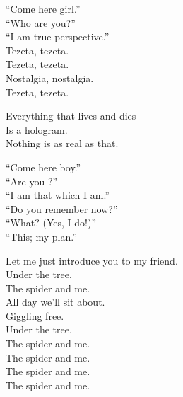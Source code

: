 
``Come here girl.'' \\
``Who are you?'' \\
``I am true perspective.'' \\

Tezeta, tezeta. \\
Tezeta, tezeta. \\
Nostalgia, nostalgia. \\
Tezeta, tezeta. \\


Everything that lives and dies \\
Is a hologram. \\
Nothing is as real as that. \\


``Come here boy.'' \\
``Are you ?'' \\
``I am that which I am.'' \\

``Do you remember now?'' \\
``What? (Yes, I do!)'' \\
``This; my  plan.'' \\









Let me just introduce you to my friend. \\
Under the tree. \\
The spider and me. \\
All day we'll sit about. \\
Giggling free. \\
Under the tree. \\
The spider and me. \\

The spider and me. \\
The spider and me. \\
The spider and me. \\


